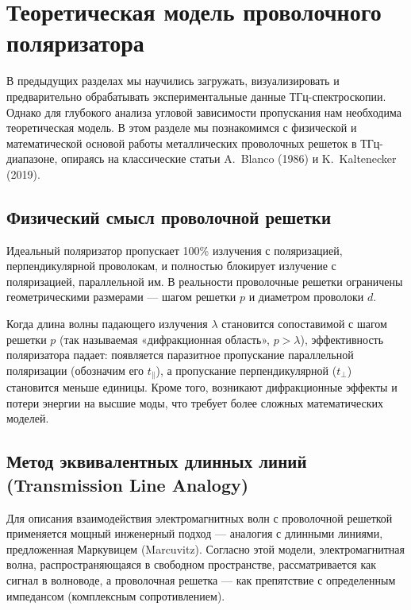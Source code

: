 
\section{Теоретическая модель проволочного поляризатора}

В предыдущих разделах мы научились загружать, визуализировать и предварительно обрабатывать экспериментальные данные ТГц-спектроскопии. Однако для глубокого анализа угловой зависимости пропускания нам необходима теоретическая модель. В этом разделе мы познакомимся с физической и математической основой работы металлических проволочных решеток в ТГц-диапазоне, опираясь на классические статьи A.~Blanco (1986) и K.~Kaltenecker (2019).

\subsection{Физический смысл проволочной решетки}

Идеальный поляризатор пропускает 100\% излучения с поляризацией, перпендикулярной проволокам, и полностью блокирует излучение с поляризацией, параллельной им. В реальности проволочные решетки ограничены геометрическими размерами — шагом решетки $p$ и диаметром проволоки $d$. 

Когда длина волны падающего излучения $\lambda$ становится сопоставимой с шагом решетки $p$ (так называемая «дифракционная область», $p > \lambda$), эффективность поляризатора падает: появляется паразитное пропускание параллельной поляризации (обозначим его $t_\parallel$), а пропускание перпендикулярной ($t_\perp$) становится меньше единицы. Кроме того, возникают дифракционные эффекты и потери энергии на высшие моды, что требует более сложных математических моделей.

\subsection{Метод эквивалентных длинных линий (Transmission Line Analogy)}

Для описания взаимодействия электромагнитных волн с проволочной решеткой применяется мощный инженерный подход — аналогия с длинными линиями, предложенная Маркувицем (Marcuvitz). 
Согласно этой модели, электромагнитная волна, распространяющаяся в свободном пространстве, рассматривается как сигнал в волноводе, а проволочная решетка — как препятствие с определенным импедансом (комплексным сопротивлением).


